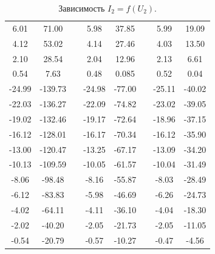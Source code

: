 \documentclass[a4paper,12pt]{article}
\begin{document}
\begin{table}[h]
\begin{tabular}{|c|c|c|c|c|c|c|c|}
6.01           & 71.00          &  & 5.98          & 37.85          &  & 5.99           & 19.09           \\ \cline{1-2} \cline{4-5} \cline{7-8} 
4.12           & 53.02          &  & 4.14          & 27.46          &  & 4.03           & 13.50           \\ \cline{1-2} \cline{4-5} \cline{7-8} 
2.10           & 28.54          &  & 2.04          & 12.96          &  & 2.13           & 6.61            \\ \cline{1-2} \cline{4-5} \cline{7-8} 
0.54           & 7.63           &  & 0.48          & 0.085          &  & 0.52           & 0.04            \\ \cline{1-2} \cline{4-5} \cline{7-8} 
-24.99         & -139.73        &  & -24.98        & -77.00         &  & -25.11         & -40.02          \\ \cline{1-2} \cline{4-5} \cline{7-8} 
-22.03         & -136.27        &  & -22.09        & -74.82         &  & -23.02         & -39.05          \\ \cline{1-2} \cline{4-5} \cline{7-8} 
-19.02         & -132.46        &  & -19.17        & -72.64         &  & -18.96         & -37.15          \\ \cline{1-2} \cline{4-5} \cline{7-8} 
-16.12         & -128.01        &  & -16.17        & -70.34         &  & -16.12         & -35.90          \\ \cline{1-2} \cline{4-5} \cline{7-8} 
-13.00         & -120.47        &  & -13.25        & -67.17         &  & -13.09         & -34.20          \\ \cline{1-2} \cline{4-5} \cline{7-8} 
-10.13         & -109.59        &  & -10.05        & -61.57         &  & -10.04         & -31.49          \\ \cline{1-2} \cline{4-5} \cline{7-8} 
-8.06          & -98.48         &  & -8.16         & -55.87         &  & -8.03          & -28.49          \\ \cline{1-2} \cline{4-5} \cline{7-8} 
-6.12          & -83.83         &  & -5.98         & -46.69         &  & -6.26          & -24.73          \\ \cline{1-2} \cline{4-5} \cline{7-8} 
-4.02          & -64.11         &  & -4.11         & -36.10         &  & -4.04          & -18.30          \\ \cline{1-2} \cline{4-5} \cline{7-8} 
-2.02          & -40.20         &  & -2.05         & -21.73         &  & -2.05          & -11.05          \\ \cline{1-2} \cline{4-5} \cline{7-8} 
-0.54          & -20.79         &  & -0.57         & -10.27         &  & -0.47          & -4.56           \\ \cline{1-2} \cline{4-5} \cline{7-8} 
\end{tabular}
\caption{Зависимость $I_2 = f(U_2)$.}
\end{table}
\end{document}
